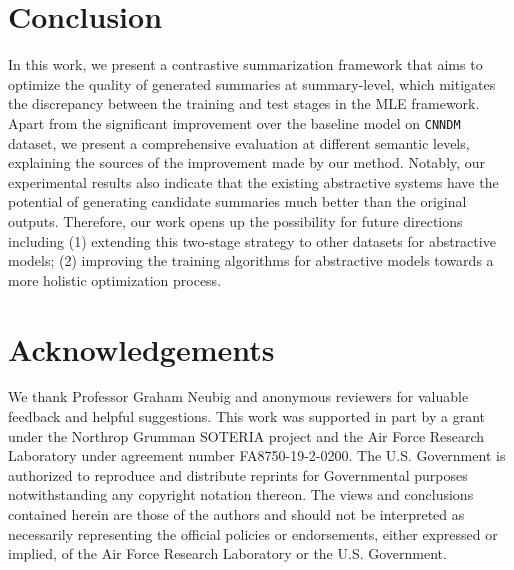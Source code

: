 \documentclass[11pt,a4paper]{article}
\begin{document}
\section{Conclusion}

In this work, we present a contrastive summarization framework that aims to optimize the quality of generated summaries at summary-level, which mitigates the discrepancy between the training and test stages in the MLE framework.
Apart from the significant improvement over the baseline model on \texttt{CNNDM} dataset, we present a comprehensive evaluation at different semantic levels, explaining the sources of the improvement made by our method.
Notably, our experimental results also indicate that the existing abstractive systems have the potential of generating candidate summaries much better than the original outputs. 
Therefore, our work opens up the possibility for future directions including (1) extending this two-stage strategy to other datasets for abstractive models; (2) improving the training algorithms for abstractive models towards a more holistic optimization process. 


\section*{Acknowledgements}

We thank Professor Graham Neubig and anonymous reviewers for valuable feedback and helpful suggestions.
This work was supported in part by a grant under the Northrop Grumman SOTERIA project and the Air Force Research Laboratory under agreement number FA8750-19-2-0200. The U.S. Government
is authorized to reproduce and distribute reprints for Governmental
purposes notwithstanding any copyright notation thereon. The views and
conclusions contained herein are those of the authors and should not be
interpreted as necessarily representing the official policies or
endorsements, either expressed or implied, of the Air Force Research
Laboratory or the U.S. Government.








\appendix
\end{document}

